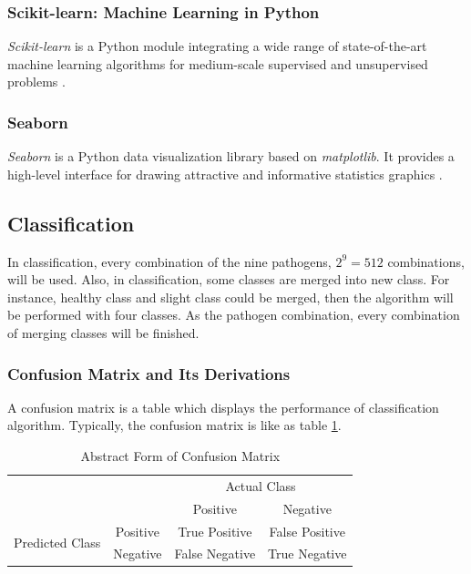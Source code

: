 \documentclass[11pt, a4paper]{article}
\begin{document}
    		\subsubsection{Scikit-learn: Machine Learning in Python}
    			\textit{Scikit-learn} is a Python module integrating a wide range of state-of-the-art machine learning algorithms for medium-scale supervised and unsupervised problems \cite{ref:sklearn1}.
    			    			
    		\subsubsection{Seaborn}
		   		\textit{Seaborn} is a Python data visualization library based on \textit{matplotlib}. It provides a high-level interface for drawing attractive and informative statistics graphics \cite{ref:seaborn1}.
		
			\subsection{Classification}
				In classification, every combination of the nine pathogens, $2^9 = 512$ combinations, will be used. Also, in classification, some classes are merged into new class. For instance, healthy class and slight class could be merged, then the algorithm will be performed with four classes. As the pathogen combination, every combination of merging classes will be finished. 
				
				\subsubsection{Confusion Matrix and Its Derivations}
					A confusion matrix is a table which displays the performance of classification algorithm. Typically, the confusion matrix is like as table \ref{tb:confusion}.
					
					\begin{table}[htbp]
						\centering
						\caption{Abstract Form of Confusion Matrix}
						\label{tb:confusion}
						\begin{tabular}{cc|cc}
							\multicolumn{2}{c}{\multirow{2}{*}{}} & \multicolumn{2}{|c}{Actual Class} \\ \cline{3-4} 
							\multicolumn{2}{c|}{} & Positive & Negative \\ \hline
							\multicolumn{1}{c|}{\multirow{2}{*}{Predicted Class}} & Positive & True Positive & False Positive \\
							\multicolumn{1}{c|}{} & Negative & False Negative & True Negative
						\end{tabular}
					\end{table}
					
\end{document}
